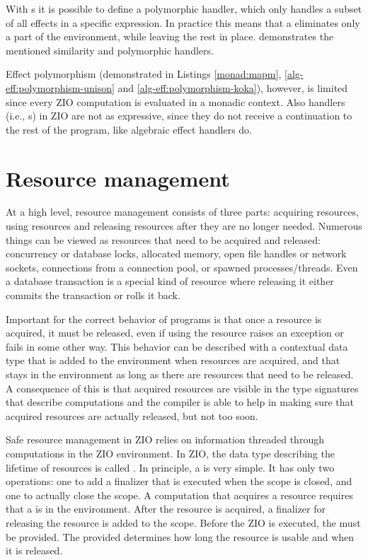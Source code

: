 With s it is possible to define a polymorphic handler, which only handles a subset of all effects in a specific expression. In practice this means that a  eliminates only a part of the environment, while leaving the rest in place.  demonstrates the mentioned similarity and polymorphic handlers.



Effect polymorphism (demonstrated in Listings \ref{monad:mapm}, \ref{alg-eff:polymorphism-unison} and \ref{alg-eff:polymorphism-koka}), however, is limited since every ZIO computation is evaluated in a monadic context. Also handlers (i.e., s) in ZIO are not as expressive, since they do not receive a continuation to the rest of the program, like algebraic effect handlers do.


\section{Resource management} \label{zio:resource-management}
At a high level, resource management consists of three parts: acquiring resources, using resources and releasing resources after they are no longer needed. Numerous things can be viewed as resources that need to be acquired and released: concurrency or database locks, allocated memory, open file handles or network sockets, connections from a connection pool, or spawned processes/threads. Even a database transaction is a special kind of resource where releasing it either commits the transaction or rolls it back.

Important for the correct behavior of programs is that once a resource is acquired, it must be released, even if using the resource raises an exception or fails in some other way. This behavior can be described with a contextual data type that is added to the environment when resources are acquired, and that stays in the environment as long as there are resources that need to be released. A consequence of this is that acquired resources are visible in the type signatures that describe computations and the compiler is able to help in making sure that acquired resources are actually released, but not too soon.

Safe resource management in ZIO relies on information threaded through computations in the ZIO environment. In ZIO, the data type describing the lifetime of resources is called . In principle, a  is very simple. It has only two operations: one to add a finalizer that is executed when the scope is closed, and one to actually close the scope. A computation that acquires a resource requires that a  is in the environment. After the resource is acquired, a finalizer for releasing the resource is added to the scope. Before the ZIO is executed, the  must be provided. The provided  determines how long the resource is usable and when it is released. 

